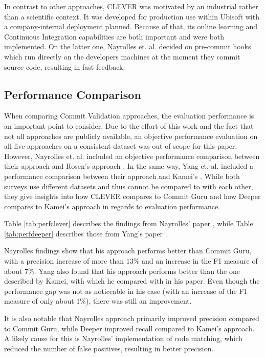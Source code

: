 In contrast to other approaches, CLEVER was motivated by an industrial rather than a scientific context. It was developed for production use within Ubisoft with a company-internal deployment planned. Because of that, its online learning and Continuous Integration capabilities are both important and were both implemented. On the latter one, Nayrolles et. al. decided on pre-commit hooks which run directly on the developers machines at the moment they commit source code, resulting in fast feedback.

\subsection{Performance Comparison}
\label{sec:performance}

When comparing Commit Validation approaches, the evaluation performance is an important point to consider. Due to the effort of this work and the fact that not all approaches are publicly available, an objective performance evaluation on all five approaches on a consistent dataset was out of scope for this paper. However, Nayrolles et. al. included an objective performance comparison between their approach and Rosen's approach \cite{Nayrolles2018}. In the same 
way, %
Yang et. al. included a performance comparison between their approach and Kamei's \cite{Yang2015}. While both surveys use different datasets and thus cannot be compared to with each other, they give insights into how CLEVER compares to Commit Guru and how Deeper compares to Kamei's approach in regards to evaluation performance.

Table \ref{tab:perfclever} describes the findings from Nayrolles' paper \cite{Nayrolles2018}, while Table \ref{tab:perfdeeper} describes those from Yang's paper \cite{Yang2015}.

Nayrolles findings show that his approach performs better than Commit Guru, with a precision increase of more than $13\%$ and an increase in the F1 measure of about $7\%$. Yang also found that his approach performs better than the one described by Kamei, with which he compared with in his paper. Even though the performance gap was not as noticeable in his case (with an increase of the F1 measure of only about $1\%$), there was still an improvement. 

It is also notable that Nayrolles approach primarily improved precision compared to Commit Guru, while Deeper improved recall compared to Kamei's approach. 
A likely cause for this is Nayrolles' implementation of code matching, which reduced the number of false positives, resulting in better precision.

